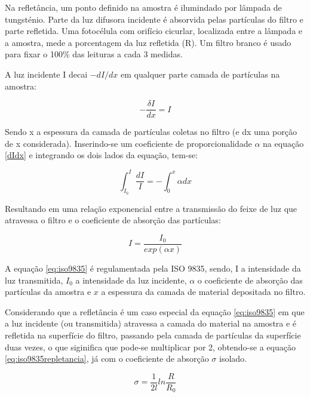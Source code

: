 Na refletância, um ponto definido na amostra é ilumindado por lâmpada de 
tungsténio. Parte da luz difusora incidente é absorvida pelas partículas
do filtro e parte refletida. Uma fotocélula com orifício cicurlar, localizada
entre a lâmpada e a amostra, mede a porcentagem da luz refletida (R).
Um filtro branco é usado para fixar o 100\% das leituras a cada 3 medidas.

A luz incidente I decai $-dI/dx$ em qualquer parte camada de partículas na 
amostra:

\begin{equation}
  \label{eq:dIdx}
  -\frac{\delta I}{dx} = I
\end{equation}

Sendo x a espessura da camada de partículas coletas no filtro (e dx uma porção
de x considerada). 
Inserindo-se um coeficiente de proporcionalidade $\alpha$ na equação \ref{dIdx}
e integrando os dois lados da equação, tem-se:

\begin{equation}
  \int_{I_0}^{I} \frac{dI}{I} = - \int_{0}^{x} \alpha dx
\end{equation}

Resultando em uma relação exponencial entre a transmissão do feixe de luz 
que atravessa o filtro e o coeficiente de absorção das partículas:

\begin{equation}
  \label{eq:iso9835}
  I = \frac{I_0}{exp(\alpha x)}
\end{equation}

A equação \ref{eq:iso9835} é regulamentada pela ISO 9835, sendo, I a intensidade 
da luz transmitida, $I_0$ a intensidade da luz incidente, $\alpha$ o coeficiente
de absorção das partículas da amostra e $x$ a espessura da camada de material
depositada no filtro. 

Considerando que a refletância é um caso especial da equação \ref{eq:iso9835} 
em que a luz incidente (ou transmitida) atravessa a camada do material na 
amostra e é refletida na superfície do filtro, passando pela camada de 
partículas da superfície duas vezes, o que siginifica que pode-se
multiplicar  por 2, obtendo-se a equação 
\ref{eq:iso9835repletancia}, já com o coeficiente de absorção $\sigma$
isolado.

\begin{equation}
  \label{eq:iso9835refletancia}
  \sigma = \frac{1}{2l} ln\frac{R}{R_0}
\end{equation}
 

